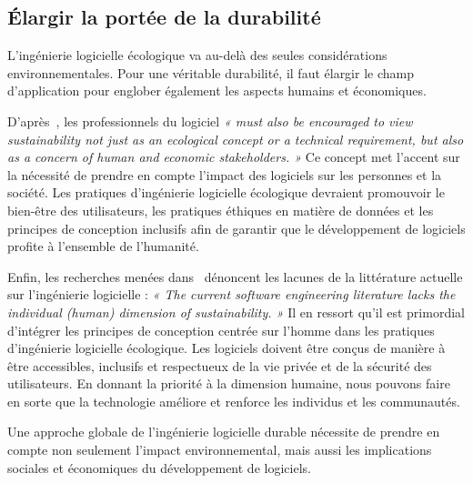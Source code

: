 \subsection{Élargir la portée de la durabilité}
L'ingénierie logicielle écologique va au-delà des seules considérations environnementales. Pour une véritable durabilité, il faut élargir le champ d'application pour englober également les aspects humains et économiques.


D'après~\cite{SustainableStratifiedTheory}, les professionnels du logiciel \emph{« must also be encouraged to view sustainability not just as an ecological concept or a technical requirement, but also as a concern of human and economic stakeholders. »} Ce concept met l'accent sur la nécessité de prendre en compte l'impact des logiciels sur les personnes et la société. Les pratiques d'ingénierie logicielle écologique devraient promouvoir le bien-être des utilisateurs, les pratiques éthiques en matière de données et les principes de conception inclusifs afin de garantir que le développement de logiciels profite à l'ensemble de l'humanité.


Enfin, les recherches menées dans~\cite{SustainableEngNeglectedPerspective} dénoncent les lacunes de la littérature actuelle sur l'ingénierie logicielle : \emph{« The current software engineering literature lacks the individual (human) dimension of sustainability. »} Il en ressort qu'il est primordial d'intégrer les principes de conception centrée sur l'homme dans les pratiques d'ingénierie logicielle écologique. Les logiciels doivent être conçus de manière à être accessibles, inclusifs et respectueux de la vie privée et de la sécurité des utilisateurs. En donnant la priorité à la dimension humaine, nous pouvons faire en sorte que la technologie améliore et renforce les individus et les communautés.


Une approche globale de l'ingénierie logicielle durable nécessite de prendre en compte non seulement l'impact environnemental, mais aussi les implications sociales et économiques du développement de logiciels.



